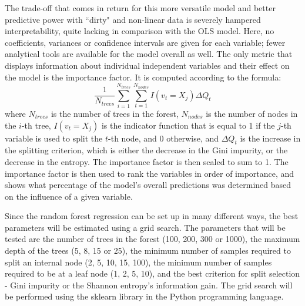 \documentclass[12pt]{report}
\begin{document}
The trade-off that comes in return for this more versatile model and better predictive power with ``dirty" and non-linear data is severely hampered interpretability, quite lacking in comparison with the OLS model. Here, no coefficients, variances or confidence intervals are given for each variable; fewer analytical tools are available for the model overall as well. The only metric that displays information about individual independent variables and their effect on the model is the importance factor. It is computed according to the formula:
\begin{equation}
	\frac{1}{N_{trees}} \sum_{i=1}^{N_{trees}} \sum_{t=1}^{N_{nodes}} I(v_{t} = X_j) \Delta Q_{t}
\end{equation}
where $N_{trees}$ is the number of trees in the forest, $N_{nodes}$ is the number of nodes in the $i$-th tree, $I(v_{t} = X_j)$ is the indicator function that is equal to 1 if the $j$-th variable is used to split the $t$-th node, and 0 otherwise, and $\Delta Q_{t}$ is the increase in the splitting criterion, which is either the decrease in the Gini impurity, or the decrease in the entropy. The importance factor is then scaled to sum to 1. The importance factor is then used to rank the variables in order of importance, and shows what percentage of the model's overall predictions was determined based on the influence of a given variable.

Since the random forest regression can be set up in many different ways, the best parameters will be estimated using a grid search. The parameters that will be tested are the number of trees in the forest (100, 200, 300 or 1000), the maximum depth of the trees (5, 8, 15 or 25), the minimum number of samples required to split an internal node (2, 5, 10, 15, 100), the minimum number of samples required to be at a leaf node (1, 2, 5, 10), and the best criterion for split selection - Gini impurity or the Shannon entropy's information gain. The grid search will be performed using the sklearn library in the Python programming language.
\end{document}
